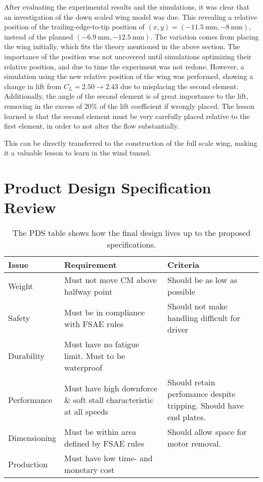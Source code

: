   After evaluating the experimental results and the simulations, it was clear that an investigation of the down scaled wing model was due. This revealing a relative position of the trailing-edge-to-tip position of $(x,y) = (\SI{-11.5}{\milli\metre},\SI{-8}{\milli\metre})$, instead of the planned $(\SI{-6.9}{\milli\metre},\SI{-12.5}{\milli\metre})$. The variation comes from placing the wing initially, which fits the theory mentioned in the above section. The importance of the position was not uncovered until simulations optimizing their relative position, and due to time the experiment was not redone. However, a simulation using the new relative position of the wing was performed, showing a change in lift from $ C_L = 2.50 \rightarrow 2.43$ due to misplacing the second element. Additionally, the angle of the second element is of great importance to the lift, removing in the excess of $20\%$ of the lift coefficient if wrongly placed. The lesson learned is that the second element must be very carefully placed relative to the first element, in order to not alter the flow substantially.

  This can be directly transferred to the construction of the full scale wing, making it a valuable lesson to learn in the wind tunnel.

\section{Product Design Specification Review}

  \begin{table}
    \begin{tabularx}{\textwidth}[t]{>{\columncolor{seapurple!40}}l XX}
      \arrayrulecolor{seapurple}\hline
      \rowcolor{white}
      \textbf{\textcolor{seapurple}{Issue}} & \textbf{\textcolor{seapurple}{Requirement}} & \textbf{\textcolor{seapurple}{Criteria}}\\
      \hline
      Weight & \cellcolor{seagreen!40}Must not move CM above halfway point & \cellcolor{seagreen!40}Should be as low as possible \\
      Safety & \cellcolor{seagreen!40}Must be in compliance with FSAE rules & \cellcolor{seagreen!40}Should not make handling difficult for driver\\
      Durability & \cellcolor{seagreen!40} Must have no fatigue limit. Must to be waterproof \\
      Performance & \cellcolor{seagreen!40} Must have high downforce \& soft stall characteristic at all speeds &\cellcolor{seagreen!40} Should retain perfomance despite tripping. Should have end plates.\\
      Dimensioning & \cellcolor{seagreen!40} Must be within area defined by FSAE rules & \cellcolor{seayellow!40} Should allow space for motor removal. \\
      Production & \cellcolor{seagreen!40} Must have low time- and monetary cost
    \end{tabularx}
    \caption{The PDS table shows how the final design lives up to the proposed specifications.}
    \label{tab:designreview}
  \end{table}

